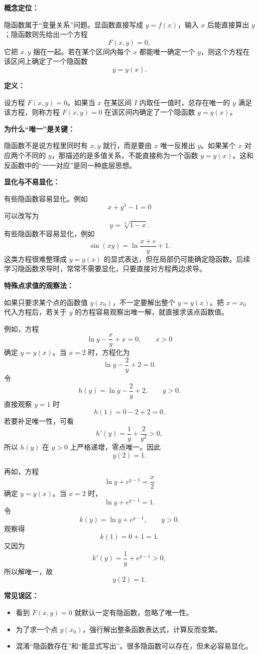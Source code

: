 \begin{knowledgeBox}
\textbf{概念定位：}

隐函数属于“变量关系”问题。显函数直接写成 \(y=f(x)\)，输入 \(x\) 后能直接算出 \(y\)；隐函数则先给出一个方程
\[
F(x,y)=0,
\]
它把 \(x,y\) 捆在一起。若在某个区间内每个 \(x\) 都能唯一确定一个 \(y\)，则这个方程在该区间上确定了一个隐函数
\[
y=y(x).
\]

\textbf{定义：}

设方程 \(F(x,y)=0\)。如果当 \(x\) 在某区间 \(I\) 内取任一值时，总存在唯一的 \(y\) 满足该方程，则称方程 \(F(x,y)=0\) 在该区间内确定了一个隐函数 \(y=y(x)\)。

\textbf{为什么“唯一”是关键：}

隐函数不是说方程里同时有 \(x,y\) 就行，而是要由 \(x\) 唯一反推出 \(y\)。如果某个 \(x\) 对应两个不同的 \(y\)，那描述的是多值关系，不能直接称为一个函数 \(y=y(x)\)。这和反函数中的“一一对应”是同一种底层思想。

\textbf{显化与不易显化：}

有些隐函数容易显化。例如
\[
x+y^3-1=0
\]
可以改写为
\[
y=\sqrt[3]{1-x}.
\]
有些隐函数不容易显化，例如
\[
\sin(xy)=\ln\frac{x+e}{y}+1.
\]
这类方程很难整理成 \(y=y(x)\) 的显式表达，但在局部仍可能确定隐函数。后续学习隐函数求导时，常常不需要显化，只要直接对方程两边求导。

\textbf{特殊点求值的观察法：}

如果只要求某个点的函数值 \(y(x_0)\)，不一定要解出整个 \(y=y(x)\)。把 \(x=x_0\) 代入方程后，若关于 \(y\) 的方程容易观察出唯一解，就直接求该点函数值。

例如，方程
\[
\ln y-\frac{x}{y}+x=0,\qquad x>0
\]
确定 \(y=y(x)\)。当 \(x=2\) 时，方程化为
\[
\ln y-\frac{2}{y}+2=0.
\]
令
\[
h(y)=\ln y-\frac{2}{y}+2,\qquad y>0.
\]
直接观察 \(y=1\) 时
\[
h(1)=0-2+2=0.
\]
若要补足唯一性，可看
\[
h'(y)=\frac1y+\frac{2}{y^2}>0,
\]
所以 \(h(y)\) 在 \(y>0\) 上严格递增，零点唯一。因此
\[
y(2)=1.
\]

再如，方程
\[
\ln y+e^{y-1}=\frac{x}{2}
\]
确定 \(y=y(x)\)。当 \(x=2\) 时，
\[
\ln y+e^{y-1}=1.
\]
令
\[
k(y)=\ln y+e^{y-1},\qquad y>0.
\]
观察得
\[
k(1)=0+1=1.
\]
又因为
\[
k'(y)=\frac1y+e^{y-1}>0,
\]
所以解唯一，故
\[
y(2)=1.
\]

\textbf{常见误区：}

\begin{itemize}
  \item 看到 \(F(x,y)=0\) 就默认一定有隐函数，忽略了唯一性。
  \item 为了求一个点 \(y(x_0)\)，强行解出整条函数表达式，计算反而变繁。
  \item 混淆“隐函数存在”和“能显式写出”。很多隐函数可以存在，但未必容易显化。
\end{itemize}
\end{knowledgeBox}

